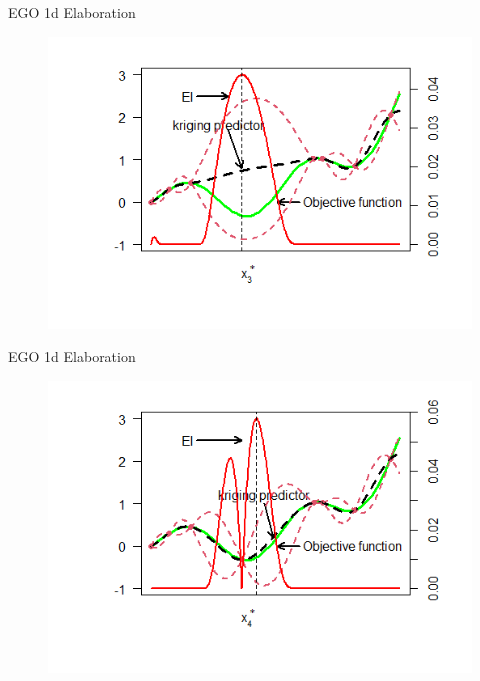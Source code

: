 \documentclass{beamer}
\begin{document}
\begin{frame}{EGO 1d Elaboration}
\begin{figure}
    \centering
    \includegraphics[scale=.7]{images/ego1d/fn7.png}
    \label{fig:f7}
\end{figure}
\end{frame}

\begin{frame}{EGO 1d Elaboration}
\begin{figure}
    \centering
    \includegraphics[scale=.7]{images/ego1d/fn8.png}
    \label{fig:f8}
\end{figure}
\end{frame}
\end{document}
